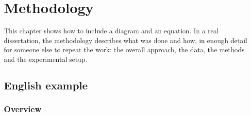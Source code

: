 \chapter{Methodology}
\label{chap:methodology}

This chapter shows how to include a diagram and an equation. In a real
dissertation, the methodology describes what was done and how, in enough
detail for someone else to repeat the work: the overall approach, the data,
the methods and the experimental setup.

\section{English example}
\label{sec:method:en}

\subsection{Overview}
\label{sec:method:overview}

